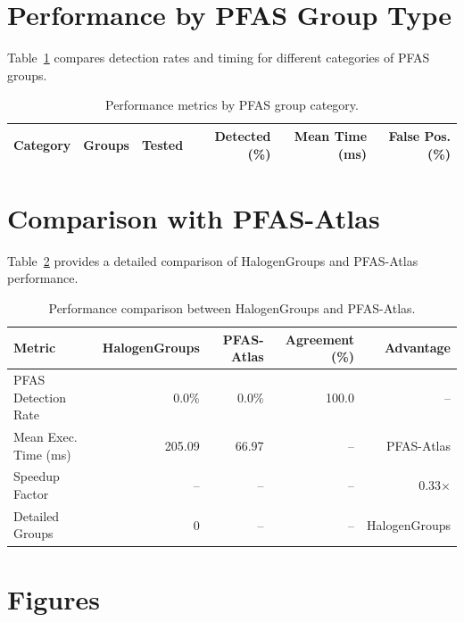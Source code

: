 \section*{Performance by PFAS Group Type}

Table~\ref{tab:group_type_performance} compares detection rates and timing for different categories of PFAS groups.

\begin{table}[htbp]
\centering
\caption{Performance metrics by PFAS group category.}
\label{tab:group_type_performance}
\begin{tabular}{lrrrrr}
\toprule
\rowcolor[HTML]{D6E4F5}\textbf{Category} & \textbf{Groups} & \textbf{Tested} & \textbf{Detected (\%)} & \textbf{Mean Time (ms)} & \textbf{False Pos. (\%)} \\
\midrule
\bottomrule
\end{tabular}
\end{table}

\section*{Comparison with PFAS-Atlas}

Table~\ref{tab:atlas_comparison} provides a detailed comparison of HalogenGroups and PFAS-Atlas performance.

\begin{table}[htbp]
\centering
\caption{Performance comparison between HalogenGroups and PFAS-Atlas.}
\label{tab:atlas_comparison}
\begin{tabular}{lrrrr}
\toprule
\rowcolor[HTML]{D6E4F5}\textbf{Metric} & \textbf{HalogenGroups} & \textbf{PFAS-Atlas} & \textbf{Agreement (\%)} & \textbf{Advantage} \\
\midrule
\rowcolor[HTML]{FAEADE}PFAS Detection Rate & 0.0\% & 0.0\% & 100.0 & -- \\
Mean Exec. Time (ms) & 205.09 & 66.97 & -- & PFAS-Atlas \\
\rowcolor[HTML]{F5F5F5}Speedup Factor & -- & -- & -- & 0.33$\times$ \\
\rowcolor[HTML]{F2DCE9}Detailed Groups & 0 & -- & -- & HalogenGroups \\
\bottomrule
\end{tabular}
\end{table}

\section*{Figures}

